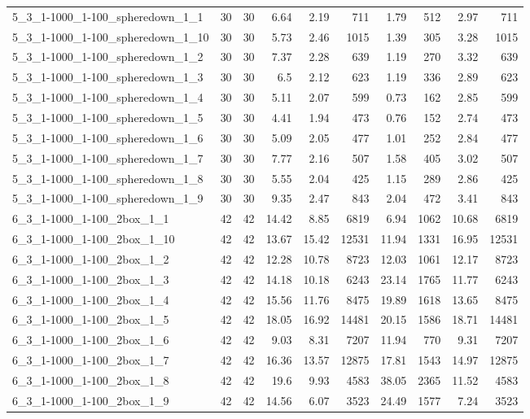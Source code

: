 \begin{center}
\begin{scriptsize}
\begin{longtable}{lrrrrrrrrr}
5\_3\_1-1000\_1-100\_spheredown\_1\_1 & 30 & 30 & 6.64 & 2.19 & 711 & 1.79 & 512 & 2.97 & 711\\
5\_3\_1-1000\_1-100\_spheredown\_1\_10 & 30 & 30 & 5.73 & 2.46 & 1015 & 1.39 & 305 & 3.28 & 1015\\
5\_3\_1-1000\_1-100\_spheredown\_1\_2 & 30 & 30 & 7.37 & 2.28 & 639 & 1.19 & 270 & 3.32 & 639\\
5\_3\_1-1000\_1-100\_spheredown\_1\_3 & 30 & 30 & 6.5 & 2.12 & 623 & 1.19 & 336 & 2.89 & 623\\
5\_3\_1-1000\_1-100\_spheredown\_1\_4 & 30 & 30 & 5.11 & 2.07 & 599 & 0.73 & 162 & 2.85 & 599\\
5\_3\_1-1000\_1-100\_spheredown\_1\_5 & 30 & 30 & 4.41 & 1.94 & 473 & 0.76 & 152 & 2.74 & 473\\
5\_3\_1-1000\_1-100\_spheredown\_1\_6 & 30 & 30 & 5.09 & 2.05 & 477 & 1.01 & 252 & 2.84 & 477\\
5\_3\_1-1000\_1-100\_spheredown\_1\_7 & 30 & 30 & 7.77 & 2.16 & 507 & 1.58 & 405 & 3.02 & 507\\
5\_3\_1-1000\_1-100\_spheredown\_1\_8 & 30 & 30 & 5.55 & 2.04 & 425 & 1.15 & 289 & 2.86 & 425\\
5\_3\_1-1000\_1-100\_spheredown\_1\_9 & 30 & 30 & 9.35 & 2.47 & 843 & 2.04 & 472 & 3.41 & 843\\
6\_3\_1-1000\_1-100\_2box\_1\_1 & 42 & 42 & 14.42 & 8.85 & 6819 & 6.94 & 1062 & 10.68 & 6819\\
6\_3\_1-1000\_1-100\_2box\_1\_10 & 42 & 42 & 13.67 & 15.42 & 12531 & 11.94 & 1331 & 16.95 & 12531\\
6\_3\_1-1000\_1-100\_2box\_1\_2 & 42 & 42 & 12.28 & 10.78 & 8723 & 12.03 & 1061 & 12.17 & 8723\\
6\_3\_1-1000\_1-100\_2box\_1\_3 & 42 & 42 & 14.18 & 10.18 & 6243 & 23.14 & 1765 & 11.77 & 6243\\
6\_3\_1-1000\_1-100\_2box\_1\_4 & 42 & 42 & 15.56 & 11.76 & 8475 & 19.89 & 1618 & 13.65 & 8475\\
6\_3\_1-1000\_1-100\_2box\_1\_5 & 42 & 42 & 18.05 & 16.92 & 14481 & 20.15 & 1586 & 18.71 & 14481\\
6\_3\_1-1000\_1-100\_2box\_1\_6 & 42 & 42 & 9.03 & 8.31 & 7207 & 11.94 & 770 & 9.31 & 7207\\
6\_3\_1-1000\_1-100\_2box\_1\_7 & 42 & 42 & 16.36 & 13.57 & 12875 & 17.81 & 1543 & 14.97 & 12875\\
6\_3\_1-1000\_1-100\_2box\_1\_8 & 42 & 42 & 19.6 & 9.93 & 4583 & 38.05 & 2365 & 11.52 & 4583\\
6\_3\_1-1000\_1-100\_2box\_1\_9 & 42 & 42 & 14.56 & 6.07 & 3523 & 24.49 & 1577 & 7.24 & 3523\\

\end{longtable}
\end{scriptsize}
\end{center}
